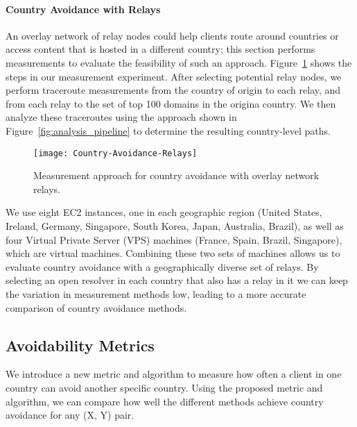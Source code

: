 \paragraph{Country Avoidance with Relays} 
An overlay network of relay nodes could
help clients route around countries or access content 
that is hosted in a different country; this section performs measurements to evaluate
the feasibility of such an approach. Figure~\ref{fig:avoidance_relays}
shows the steps in our measurement experiment.
After selecting potential relay nodes, we perform traceroute measurements from
the country of origin to each relay, and from each relay to the set of top 100 domains
in the origina country. We
then analyze these traceroutes using the approach shown in Figure~\ref{fig:analysis_pipeline}
to determine the resulting country-level paths. 

\begin{figure}[t]
\centering
\texttt{[image: Country-Avoidance-Relays]}
\caption{Measurement approach for country avoidance with overlay network relays.}
\label{fig:avoidance_relays}
\end{figure}

We use eight EC2 instances, one in each geographic region
(United States, Ireland, Germany, Singapore, South Korea, Japan, Australia,
Brazil), as well as four Virtual Private Server (VPS) machines (France,
Spain, Brazil, Singapore), which are virtual machines.
Combining these two sets of machines allows us to evaluate country avoidance with a geographically diverse set of relays. 
By selecting an open resolver in each country that also has a relay in it we can keep the variation in measurement methods low, leading to a more accurate comparison of country avoidance methods.

\subsection{Avoidability Metrics}
\label{metrics}

We introduce a new metric and algorithm to measure how often a client in
one country can avoid another specific country.
Using the proposed metric
and algorithm, we can compare how well the different methods achieve
country avoidance for any (X, Y) pair.

